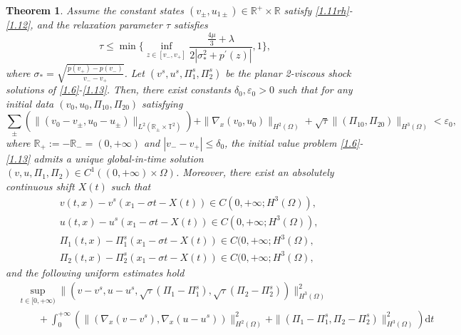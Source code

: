 \documentclass[10pt,reqno]{amsart}
\numberwithin{equation}{section}
\newtheorem{theorem}{Theorem}[section]
\newcommand{\dif}{\mathrm{d}}
\begin{document}
\begin{theorem}\label{th1.1}
Assume the constant states $(v_\pm, u_{1\pm}) \in \mathbb{R}^+ \times \mathbb{R}$ satisfy \eqref{1.11rh}-\eqref{1.12}, and the relaxation parameter $\tau$ satisfies
\begin{equation}\label{sccs}
\tau\leq \min\{\inf\limits_{z\in[v_-,v_+]}\frac{\frac{4\mu}{3}+\lambda}{2|\sigma_\ast^2+p^{\prime}(z)|},
1\},
\end{equation}
 where $\sigma_\ast=\sqrt{\frac{p(v_+)-p(v_-)}{v_--v_+}}$. Let $(v^s, u^s, \Pi_1^s, \Pi_2^s)$ be the planar 2-viscous shock solutions of \eqref{1.6}-\eqref{1.13}. Then, there exist constants $\delta_0,\varepsilon_0>0$ such that for any initial data $(v_0, u_0, \Pi_{10}, \Pi_{20})$ satisfying
\begin{equation}\label{csz}
\sum\limits_{\pm}\left(\|(v_0-v_{\pm},u_0-u_{\pm})\|_{L^2(\mathbb{R}_\pm\times\mathbb{T}^2)}\right)
+\|\nabla_x(v_0,u_0)\|_{H^2(\Omega)}
+\sqrt{\tau}\|(\Pi_{10}, \Pi_{20})\|_{H^3(\Omega)}<\varepsilon_0,
\end{equation}
where $\mathbb{R}_+:=-\mathbb{R}_-=(0,+\infty)$ and $|v_--v_+|\leq\delta_0$, the initial value problem \eqref{1.6}-\eqref{1.13} admits a unique global-in-time solution $(v, u, \Pi_1, \Pi_2)\in C^1((0, +\infty)\times \Omega)$. Moreover, there exist an absolutely continuous shift $X(t)$ such that
\begin{equation}\label{lxx1}
\begin{aligned}
&v(t,x)-v^s(x_1-\sigma t-X(t))\in C(0,+\infty;H^3(\Omega)),\\
&u(t,x)-u^s(x_1-\sigma t-X(t))\in C(0,+\infty;H^3(\Omega)),\\
&\Pi_1(t,x)-\Pi_1^s(x_1-\sigma t-X(t))\in C(0,+\infty;H^3(\Omega),\\
&\Pi_2(t,x)-\Pi_2^s(x_1-\sigma t-X(t))\in C(0,+\infty;H^3(\Omega),
\end{aligned}
\end{equation}
and the following uniform estimates hold
\begin{equation}\label{lxx2}
\begin{aligned}
&\sup\limits_{t\in[0,+\infty)}\|(v-v^s, u-u^s, \sqrt\tau(\Pi_1-\Pi_1^s), 
\sqrt\tau(\Pi_2-\Pi_2^s))\|^2_{H^3(\Omega)}\\
&\qquad+\int_0^{+\infty}\left(\|\left(\nabla_x(v-v^s),\nabla_x (u-u^s)\right)\|^2_{H^2(\Omega)}+\|(\Pi_1-\Pi_1^s, \Pi_2-\Pi_2^s)\|^2_{H^3(\Omega)}\right)\dif t\\

\end{aligned}
\end{equation}
\end{theorem}
\end{document}
